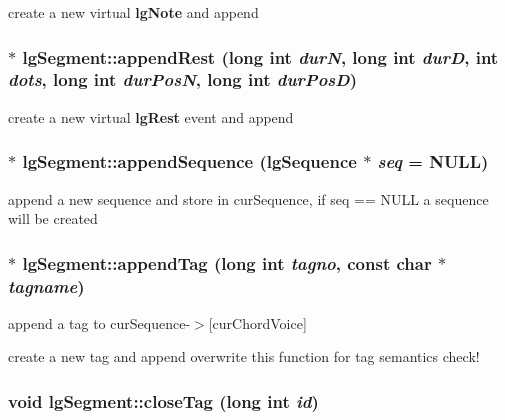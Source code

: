 create a new virtual {\bf lg\-Note} and append 

\subsubsection{$\ast$ lg\-Segment::append\-Rest (long int {\em dur\-N}, long int {\em dur\-D}, int {\em dots}, long int {\em dur\-Pos\-N}, long int {\em dur\-Pos\-D})\hspace{0.3cm}{\tt  [inline]}}\label{classlgSegment_a7}


create a new virtual {\bf lg\-Rest} event and append 

\subsubsection{ $\ast$ lg\-Segment::append\-Sequence ({\bf lg\-Sequence} $\ast$ {\em seq} = NULL)\hspace{0.3cm}{\tt  [virtual]}}\label{classlgSegment_a16}


append a new sequence and store in cur\-Sequence, if seq == NULL a sequence will be created 

\subsubsection{ $\ast$ lg\-Segment::append\-Tag (long int {\em tagno}, const char $\ast$ {\em tagname})\hspace{0.3cm}{\tt  [virtual]}}\label{classlgSegment_a12}


append a tag to cur\-Sequence-$>$[cur\-Chord\-Voice] 

create a new tag and append overwrite this function for tag semantics check! 
\subsubsection{\setlength{\rightskip}{0pt plus 5cm}void lg\-Segment::close\-Tag (long int {\em id})}\label{classlgSegment_a18}


